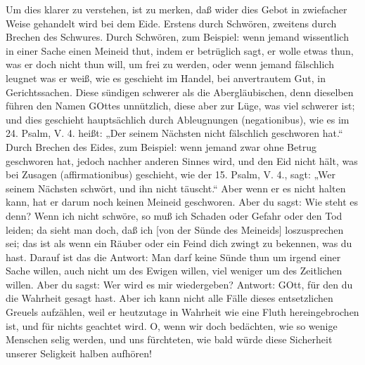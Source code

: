 Um dies klarer zu verstehen, ist zu merken, daß wider dies Gebot in zwiefacher Weise gehandelt wird bei dem Eide. Erstens durch Schwören, zweitens durch Brechen des Schwures. Durch Schwören, zum Beispiel: wenn jemand wissentlich in einer Sache einen Meineid thut, indem er betrüglich sagt, er wolle etwas thun, was er doch nicht thun will, um frei zu werden, oder wenn jemand fälschlich leugnet was er weiß, wie es geschieht im Handel, bei anvertrautem Gut, in Gerichtssachen. Diese sündigen schwerer als die Abergläubischen, denn dieselben führen den Namen GOttes unnützlich, diese aber zur Lüge, was viel schwerer ist; und dies geschieht hauptsächlich durch Ableugnungen (negationibus), wie es im 24. Psalm, V. 4. heißt: „Der seinem Nächsten nicht fälschlich geschworen hat.“ Durch Brechen des Eides, zum Beispiel: wenn jemand
zwar ohne Betrug geschworen hat, jedoch nachher anderen Sinnes wird, und den Eid nicht hält, was bei Zusagen (affirmationibus) geschieht, wie der 15. Psalm, V. 4., sagt: „Wer seinem Nächsten schwört, und ihn nicht täuscht.“ Aber wenn er es nicht halten kann, hat er darum noch keinen Meineid geschworen. Aber du sagst: Wie steht es denn? Wenn ich nicht schwöre, so muß ich Schaden oder Gefahr oder den Tod leiden; da sieht man doch, daß ich [von der Sünde des Meineids] loszusprechen sei; das ist als wenn ein Räuber oder ein Feind dich zwingt zu bekennen, was du hast. Darauf ist das die Antwort: Man darf keine Sünde thun um irgend einer Sache willen, auch nicht um des Ewigen willen, viel weniger um des Zeitlichen willen. Aber du sagst: Wer wird es mir wiedergeben? Antwort: GOtt, für den du die Wahrheit gesagt hast. Aber ich kann nicht alle Fälle dieses entsetzlichen Greuels aufzählen, weil er heutzutage in Wahrheit wie eine Fluth hereingebrochen ist, und für nichts geachtet wird. O, wenn wir doch bedächten, wie so wenige Menschen selig werden, und uns fürchteten, wie bald würde diese Sicherheit unserer Seligkeit halben aufhören!

